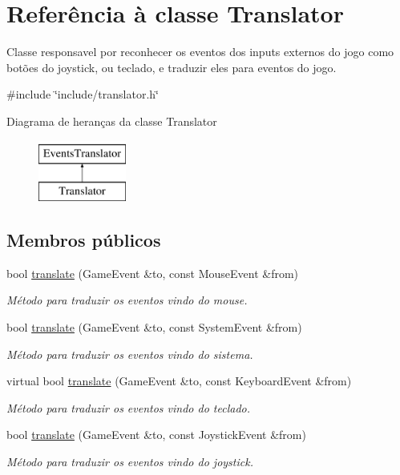 \hypertarget{classTranslator}{}\section{Referência à classe Translator}
\label{classTranslator}


Classe responsavel por reconhecer os eventos dos inputs externos do jogo como botões do joystick, ou teclado, e traduzir eles para eventos do jogo.  




{\ttfamily \#include \char`\"{}include/translator.\+h\char`\"{}}

Diagrama de heranças da classe Translator\begin{figure}[H]
\begin{center}
\leavevmode
\includegraphics[height=2.000000cm]{classTranslator}
\end{center}
\end{figure}
\subsection*{Membros públicos}
\begin{DoxyCompactItemize}
\item 
bool \mbox{\hyperlink{classTranslator_a223b870ca69e0b75b721b266a5aecd2a}{translate}} (Game\+Event \&to, const Mouse\+Event \&from)
\begin{DoxyCompactList}\small\item\em Método para traduzir os eventos vindo do mouse. \end{DoxyCompactList}\item 
bool \mbox{\hyperlink{classTranslator_ad1910814cca5d0f3d9dbffa4721071ea}{translate}} (Game\+Event \&to, const System\+Event \&from)
\begin{DoxyCompactList}\small\item\em Método para traduzir os eventos vindo do sistema. \end{DoxyCompactList}\item 
virtual bool \mbox{\hyperlink{classTranslator_a23fe703107ba6e3b26e5da8e9f28777a}{translate}} (Game\+Event \&to, const Keyboard\+Event \&from)
\begin{DoxyCompactList}\small\item\em Método para traduzir os eventos vindo do teclado. \end{DoxyCompactList}\item 
bool \mbox{\hyperlink{classTranslator_ad75df11a67688dba45a23cecc9930970}{translate}} (Game\+Event \&to, const Joystick\+Event \&from)
\begin{DoxyCompactList}\small\item\em Método para traduzir os eventos vindo do joystick. \end{DoxyCompactList}\end{DoxyCompactItemize}
